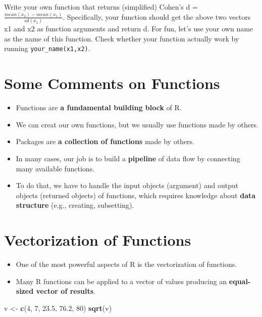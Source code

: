 \documentclass[]{book}
\newenvironment{Shaded}{\begin{snugshade}}{\end{snugshade}}
\newcommand{\KeywordTok}[1]{\textcolor[rgb]{0.13,0.29,0.53}{\textbf{{#1}}}}
\newcommand{\DecValTok}[1]{\textcolor[rgb]{0.00,0.00,0.81}{{#1}}}
\newcommand{\FloatTok}[1]{\textcolor[rgb]{0.00,0.00,0.81}{{#1}}}
\newcommand{\StringTok}[1]{\textcolor[rgb]{0.31,0.60,0.02}{{#1}}}
\newcommand{\NormalTok}[1]{{#1}}
\providecommand{\tightlist}{%
  \setlength{\itemsep}{0pt}\setlength{\parskip}{0pt}}
\begin{document}
Write your own function that returns (simplified) Cohen's d =
\(\frac{mean(x_2)-mean(x_1)}{sd(x_1)}\). Specifically, your function
should get the above two vectors x1 and x2 as function arguments and
return d. For fun, let's use your own name as the name of this function.
Check whether your function actually work by running
\texttt{your\_name(x1,x2)}.

\section{Some Comments on Functions}\label{some-comments-on-functions}

\begin{itemize}
\tightlist
\item
  Functions are \textbf{a fundamental building block} of R.
\item
  We can creat our own functions, but we usually use functions made by
  others.
\item
  Packages are \textbf{a collection of functions} made by others.
\item
  In many cases, our job is to build a \textbf{pipeline} of data flow by
  connecting many available functions.
\item
  To do that, we have to handle the input objects (argument) and output
  objects (returned objects) of functions, which requires knowledge
  about \textbf{data structure} (e.g., creating, subsetting).
\end{itemize}

\section{Vectorization of Functions}\label{vectorization-of-functions}

\begin{itemize}
\tightlist
\item
  One of the most powerful aspects of R is the vectorization of
  functions.
\item
  Many R functions can be applied to a vector of values producing an
  \textbf{equal-sized vector of results}.
\end{itemize}

\begin{Shaded}
\begin{Highlighting}[]
\NormalTok{v <-}\StringTok{ }\KeywordTok{c}\NormalTok{(}\DecValTok{4}\NormalTok{, }\DecValTok{7}\NormalTok{, }\FloatTok{23.5}\NormalTok{, }\FloatTok{76.2}\NormalTok{, }\DecValTok{80}\NormalTok{)}
\KeywordTok{sqrt}\NormalTok{(v)}
\end{Highlighting}
\end{Shaded}
\end{document}
